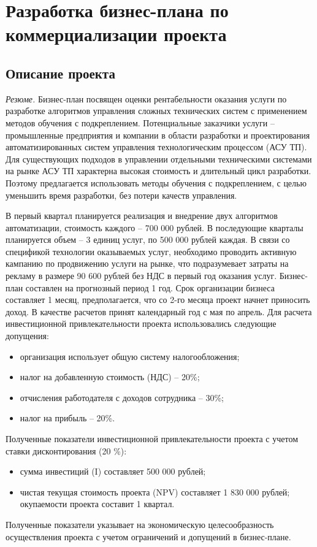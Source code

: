 \chapter{Разработка бизнес-плана по коммерциализации проекта} \label{ch4}
\section{Описание проекта}

\textit{Резюме.} Бизнес-план посвящен оценки рентабельности оказания услуги по разработке алгоритмов управления сложных технических систем с применением методов обучения с подкреплением.
Потенциальные заказчики услуги -- промышленные предприятия и компании в области разработки и проектирования автоматизированных систем управления технологическим процессом (АСУ ТП). Для существующих подходов в управлении отдельными техническими системами на рынке АСУ ТП характерна высокая стоимость и длительный цикл разработки. Поэтому предлагается использовать методы обучения с подкреплением, с целью уменьшить время разработки, без потери качеств управления.

В первый квартал планируется реализация и внедрение двух алгоритмов автоматизации, стоимость каждого -- 700 000 рублей. В последующие кварталы планируется объем -- 3 единиц услуг, по 500 000 рублей каждая.
В связи со спецификой технологии оказываемых услуг, необходимо проводить активную кампанию по продвижению услуги на рынке, что подразумевает затраты на рекламу в размере 90 600 рублей без НДС в первый год оказания услуг.
Бизнес-план составлен на прогнозный период 1 год. Срок организации бизнеса составляет 1 месяц, предполагается, что со 2-го месяца проект начнет приносить доход. В качестве расчетов принят календарный год с мая по апрель. Для расчета инвестиционной привлекательности проекта использовались следующие допущения:
\begin{itemize}
\item организация использует общую систему налогообложения;
\item налог на добавленную стоимость (НДС) – 20\%;
\item отчисления работодателя с доходов сотрудника – 30\%;
\item налог на прибыль – 20\%.
\end{itemize}

Полученные показатели инвестиционной привлекательности проекта с учетом ставки дисконтирования (20 \%): 
\begin{itemize}
\item сумма инвестиций (I) составляет 500 000 рублей;
\item чистая текущая стоимость проекта (NPV) составляет 1 830 000 рублей;
 окупаемости проекта составит 1 квартал.
\end{itemize}
Полученные показатели указывает на экономическую целесообразность осуществления проекта с учетом ограничений и допущений в бизнес-плане.


